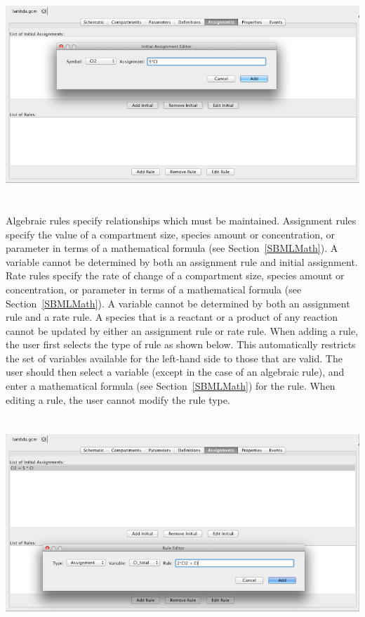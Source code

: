\documentclass[titlepage,11pt]{article}
\begin{document}
\begin{center}
\includegraphics[height=80mm]{screenshots/initial}
\end{center}

\noindent
Algebraic rules specify relationships which must be maintained.  Assignment rules specify the value of a compartment size, species amount or concentration, or parameter in terms of a mathematical formula (see
Section~\ref{SBMLMath}).  A variable cannot be determined by both an assignment rule and initial assignment.  Rate rules specify the rate of change of a compartment size, species amount or concentration, or parameter in terms of a mathematical formula (see Section~\ref{SBMLMath}).  A variable cannot be determined by both an assignment rule and a rate rule.  A species that is a reactant or a product of any reaction cannot be updated by either an assignment rule or rate rule.  
When adding a rule, the user first selects the type of rule as shown below.  This automatically restricts the set of variables available for the left-hand side to those that are valid.  The user should then select a variable (except in the case of an algebraic rule), and enter a mathematical formula (see Section~\ref{SBMLMath}) for the rule.  When editing a rule, the user cannot modify the rule type. 

\begin{center}
\includegraphics[height=80mm]{screenshots/rule}
\end{center}
\end{document}
